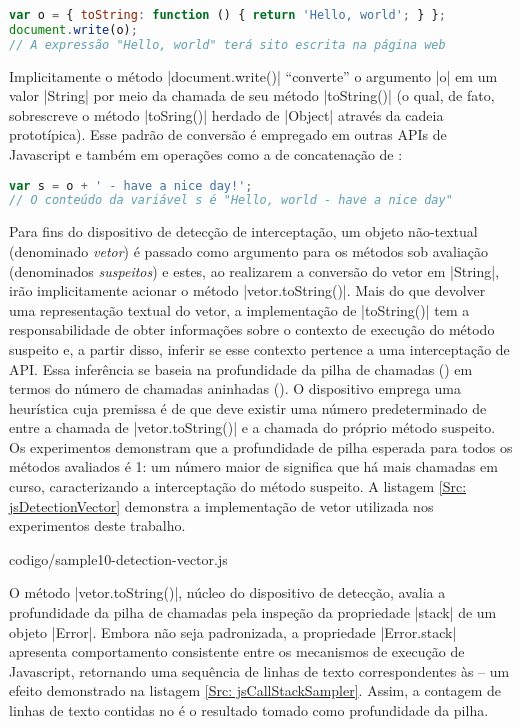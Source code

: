 \begin{lstlisting}[language=javascript]
var	o = { toString: function () { return 'Hello, world'; } };
document.write(o);
// A expressão "Hello, world" terá sito escrita na página web
\end{lstlisting}

Implicitamente o método |document.write()| ``converte'' o argumento |o| em um valor |String| por meio da chamada de seu método |toString()| (o qual, de fato, sobrescreve o método |toSring()| herdado de |Object| através da cadeia prototípica). Esse padrão de conversão é empregado em outras APIs de Javascript e também em operações como a de concatenação de :

\begin{lstlisting}[language=javascript]
var	s = o + ' - have a nice day!';
// O conteúdo da variável s é "Hello, world - have a nice day"
\end{lstlisting}

Para fins do dispositivo de detecção de interceptação, um objeto não-textual (denominado \textit{vetor}) é passado como argumento para os métodos sob avaliação (denominados \textit{suspeitos}) e estes, ao realizarem a conversão do vetor em |String|, irão implicitamente acionar o método |vetor.toString()|. Mais do que devolver uma representação textual do vetor, a implementação de |toString()| tem a responsabilidade de obter informações sobre o contexto de execução do método suspeito e, a partir disso, inferir se esse contexto pertence a uma interceptação de API. Essa inferência se baseia na profundidade da pilha de chamadas () em termos do número de chamadas aninhadas (). O dispositivo emprega uma heurística cuja premissa é de que deve existir uma número predeterminado de  entre a chamada de |vetor.toString()| e a chamada do próprio método suspeito. Os experimentos demonstram que a profundidade de pilha esperada para todos os métodos avaliados é 1: um número maior de  significa que há mais chamadas em curso, caracterizando a interceptação do método suspeito. A listagem \ref{Src: jsDetectionVector} demonstra a implementação de vetor utilizada nos experimentos deste trabalho.


	{codigo/sample10-detection-vector.js}


O método |vetor.toString()|, núcleo do dispositivo de detecção, avalia a profundidade da pilha de chamadas pela inspeção da propriedade |stack| de um objeto |Error|. Embora não seja padronizada, a propriedade |Error.stack| apresenta comportamento consistente entre os mecanismos de execução de Javascript, retornando uma sequência de linhas de texto correspondentes às  -- um efeito demonstrado na listagem \ref{Src: jsCallStackSampler}. Assim, a contagem de linhas de texto contidas no  é o resultado tomado como profundidade da pilha.

